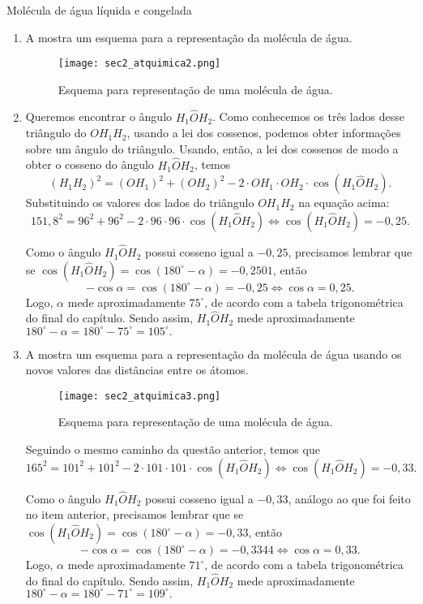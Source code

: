 \begin{answer}{Molécula de água líquida e congelada}
{
\begin{enumerate}
    \item{} A  mostra um esquema  para a representação da molécula de água. 
    \begin{figure}[H]
        \centering
        \texttt{[image: sec2\_atquimica2.png]}
        \caption{Esquema para representação de uma molécula de água.}
        \label{sec2_resatquimica2}
    \end{figure}
     
    \item{}
    Queremos encontrar o ângulo $H_1\hat{O}H_2$. Como conhecemos os três lados desse triângulo do $OH_1H_2$, usando a lei dos cossenos, podemos obter informações sobre um ângulo do triângulo. Usando, então, a lei dos cossenos de modo a obter o cosseno do ângulo $H_1\hat{O}H_2$, temos
    $$(H_1H_2)^2=(OH_1)^2+(OH_2)^2-2\cdot OH_1\cdot OH_2\cdot\cos({H_1\hat{O}H_2}).$$
    Substituindo os valores dos lados do triângulo $OH_1H_2$ na equação acima:
    $$151,8^2=96^2+96^2-2\cdot 96\cdot 96\cdot\cos({H_1\hat{O}H_2}) \iff \cos({H_1\hat{O}H_2})=-0,25.$$
    
    Como o ângulo ${H_1\hat{O}H_2}$ possui cosseno igual a $-0,25$, precisamos lembrar que se $\cos(H_1\hat{O}H_2)=\cos(180^\circ-\alpha)=-0,2501$, então 
    $$-\cos\alpha=\cos(180^\circ-\alpha)=-0,25 \iff \cos\alpha=0,25.$$
    Logo, $\alpha$ mede aproximadamente $75^\circ$, de acordo com a tabela trigonométrica do final do capítulo. Sendo assim, $H_1\hat{O}H_2$ mede aproximadamente $180^\circ-\alpha=180^\circ-75^\circ=105^\circ.$
    
    \item{}
    A  mostra um esquema  para a representação da molécula de água usando os novos valores das distâncias entre os átomos.
    \begin{figure}[H]
        \centering
        \texttt{[image: sec2\_atquimica3.png]}
        \caption{Esquema para representação de uma molécula de água.}
        \label{sec2_resatquimica3}
    \end{figure}
    Seguindo o mesmo caminho da questão anterior, temos que
    $$165^2=101^2+101^2-2\cdot 101\cdot 101\cdot\cos({H_1\hat{O}H_2}) \iff \cos({H_1\hat{O}H_2})=-0,33.$$
    
    Como o ângulo ${H_1\hat{O}H_2}$ possui cosseno igual a $-0,33$, análogo ao que foi feito no item anterior, precisamos lembrar que se $\cos(H_1\hat{O}H_2)=\cos(180^\circ-\alpha)=-0,33$, então 
    $$-\cos\alpha=\cos(180^\circ-\alpha)=-0,3344 \iff \cos\alpha=0,33.$$
    Logo, $\alpha$ mede aproximadamente $71^\circ$, de acordo com a tabela trigonométrica do final do capítulo. Sendo assim, $H_1\hat{O}H_2$ mede aproximadamente $180^\circ-\alpha=180^\circ-71^\circ=109^\circ.$
    

\end{enumerate}}
\end{answer}

